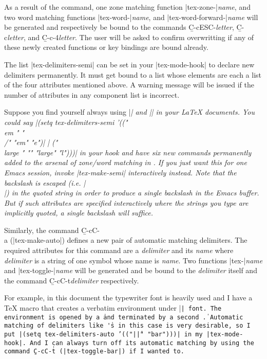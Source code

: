 {\begin{env}
\begin{minipage}
As a result of the command, one zone matching function |tex-zone-|{\it name\/},
and two word matching functions
|tex-word-|{\it name\/}, and |tex-word-forward-|{\it name\/}
will be generated and respectively be bound to the commands
{\b C-c{\s}ESC-}{\it letter\/}, {\b C-c}{\s}{\it letter\/}, 
and {\b C-c-4}{\s}{\it letter\/}.  The user will be asked to confirm 
overwritting if any of these newly created functions or key bindings are bound
already.

The list |tex-delimiters-semi| can be set in your |tex-mode-hook|
to declare new delimiters permanently.
It must get bound to a list whose elements are each a
list of the four attributes mentioned above.
A warning message will be issued if
the number of attributes in any component list is incorrect.

Suppose you find yourself always using |\em| and |\large| in your
{\LaTeX} documents.  You could say
\begindisplay
|(setq tex-delimiters-semi '(("{\\em " "\\/}" "em" "e")|\cr
|                            ("{\\large " "}" "large" "l")))|\cr
\enddisplay
in your hook and have six new commands permanently added to the arsenal of
zone/word matching in {\TM}.  If you just want this for one
Emacs session, invoke |tex-make-semi| interactively instead.
Note that the backslash is escaped (i.e. |\\|) in the quoted string
in order to produce a single backslash in the Emacs buffer.
But if such attributes are specified interactively where
the strings you type are implicitly quoted, a single backslash will suffice.

Similarly, the command {\b C-c{\s}C-\\{\s}a} (|tex-make-auto|)
defines a new pair of automatic matching delimiters.
The required attributes for this command are a
{\it delimiter\/} and its {\it name\/} where
{\it delimiter\/} is a string of one symbol whose name is {\it name\/}.
Two functions |tex-|{\it name\/}
and |tex-toggle-|{\it name\/} will be generated and be bound to the 
{\it delimiter\/} itself and the command {\b C-c{\s}C-t}{\s}{\it delimiter\/} 
respectively.

For example, in this document the typewriter font is heavily used
and I have a {\TeX} macro that creates a verbatim environment under
|\tt| font.  The environment is opened by a \| and terminated by a
second \|.  Automatic matching of delimiters like \|'s in this
case is very desirable, so I put
\begindisplay
|(setq tex-delimiters-auto '(("|\||" "bar")))|\cr
\enddisplay
in my |tex-mode-hook|.  And I can always turn off its automatic
matching by using the command {\b C-c{\s}C-t{\s}\|} (|tex-toggle-bar|)
if I wanted to.


\end{minipage}
\end{env}}
